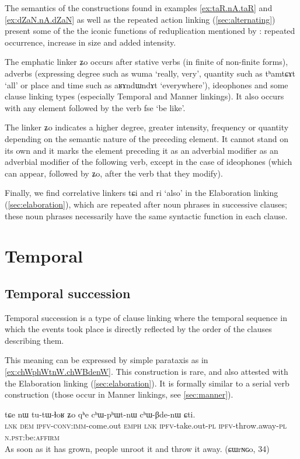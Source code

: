 \documentclass[oldfontcommands,oneside,a4paper,11pt]{article}
\newcommand{\ipa}[1]{{\phon \mbox{#1}}} %
\begin{document}
The semantics of the constructions found in examples \ref{ex:taR.nA.taR}  and \ref{ex:dZaN.nA.dZaN} as well as the   repeated action linking  (\ref{sec:alternating}) present some of the the iconic functions of reduplication mentioned by \citet[76]{sapir21lg}: repeated occurrence, increase in size and added intensity.

The emphatic linker \ipa{ʑo} occurs after stative verbs (in finite of non-finite forms), adverbs (expressing degree such as \ipa{wuma} `really, very', quantity such as \ipa{tʰamtɕɤt} `all' or place and time such as \ipa{aʁɤndɯndɤt} `everywhere'),  ideophones and some clause linking types (especially Temporal and Manner linkings). It also occurs with any element followed by the verb \ipa{fse} `be like'. 

The linker \ipa{ʑo} indicates a higher degree, greater  intensity, frequency or quantity depending on the semantic nature of the preceding element. It cannot stand on its own  and it marks   the element preceding it as an adverbial modifier as an adverbial modifier of the following verb, except in the case of ideophones (which can appear, followed by \ipa{ʑo}, after the verb that they modify).


Finally, we find correlative linkers   \ipa{tɕi} and \ipa{ri} `also' in the Elaboration linking (\ref{sec:elaboration}), which are repeated after  noun phrases in successive clauses; these noun phrases necessarily have the same syntactic function in each clause.

\section{Temporal}
\subsection{Temporal succession}  \label{sec:temporal.succession}

Temporal succession is a type of clause linking where the temporal sequence in which the events  took place is directly reflected by the order of the clauses describing them.   

This meaning can be expressed by simple parataxis as in \ref{ex:chWphWtnW.chWBdenW}. This construction is rare, and also attested with the Elaboration linking (\ref{sec:elaboration}). It is formally similar to a serial verb construction (those occur in Manner linkings, see \ref{sec:manner}).
\begin{exe}
\ex \label{ex:chWphWtnW.chWBdenW}
\gll 
\ipa{tɕe}  	\ipa{nɯ}  	\ipa{tu-tɯ-ɬoʁ}  	\ipa{ʑo}  	\ipa{qʰe}  	\ipa{cʰɯ-pʰɯt-nɯ}  	\ipa{cʰɯ-βde-nɯ}  	\ipa{ɕti.}  \\
\textsc{lnk} \textsc{dem} \textsc{ipfv-conv:imm}-come.out \textsc{emph} \textsc{lnk} \textsc{ipfv}-take.out-\textsc{pl} \textsc{ipfv}-throw.away-\textsc{pl}  \textsc{n.pst}:be:\textsc{affirm} \\
\glt As soon as it has grown, people unroot it and throw it away. (ɕɯrɴɢo, 34)
\end{exe}
\end{document}
